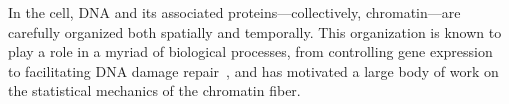 \documentclass[%
 reprint,
superscriptaddress,
showpacs,preprintnumbers,
 amsmath,amssymb,
 aps,
 prl,
]{revtex4-1}
\begin{document}
\maketitle


In the cell, DNA and its associated proteins---collectively, chromatin---are
    carefully organized both spatially and temporally.
This organization is known to play a role in a myriad of biological processes,
    from controlling gene expression~\cite{hubner2013} to facilitating DNA
    damage repair~\cite{hauer2017,stadler2017}, and has motivated a large body
    of work on the statistical mechanics of the chromatin fiber.
\end{document}
